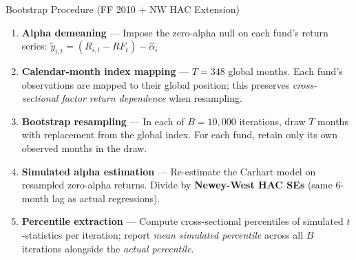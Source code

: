 \documentclass[aspectratio=169,10pt]{beamer}
\begin{document}
\begin{frame}{Bootstrap Procedure (FF 2010 + NW HAC Extension)}
\begin{enumerate}
  \setlength\itemsep{4pt}
  \item \textbf{Alpha demeaning} — Impose the zero-alpha null on each fund's return series:
  $\tilde{y}_{i,t} = (R_{i,t} - RF_t) - \hat{\alpha}_i$

  \item \textbf{Calendar-month index mapping} — $T=348$ global months. Each fund's observations are mapped to their global position; this preserves \emph{cross-sectional factor return dependence} when resampling.

  \item \textbf{Bootstrap resampling} — In each of $B=10{,}000$ iterations, draw $T$ months with replacement from the global index. For each fund, retain only its own observed months in the draw.

  \item \textbf{Simulated alpha estimation} — Re-estimate the Carhart model on resampled zero-alpha returns. Divide by \textbf{Newey-West HAC SEs} (same 6-month lag as actual regressions).

  \item \textbf{Percentile extraction} — Compute cross-sectional percentiles of simulated $t$-statistics per iteration; report \emph{mean simulated percentile} across all $B$ iterations alongside the \emph{actual percentile}.
\end{enumerate}
\end{frame}
\end{document}
